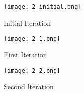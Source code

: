 \clearpage

\begin{figure}[htp]
\centering
\caption{\label{fig:q2_initial}Initial Iteration}
\texttt{[image: 2\_initial.png]}
\end{figure}

\begin{figure}[htp]
\centering
\caption{\label{fig:q2_1}First Iteration}
\texttt{[image: 2\_1.png]}
\end{figure}

\begin{figure}[htp]
\centering
\caption{\label{fig:q2_2}Second Iteration}
\texttt{[image: 2\_2.png]}
\end{figure}